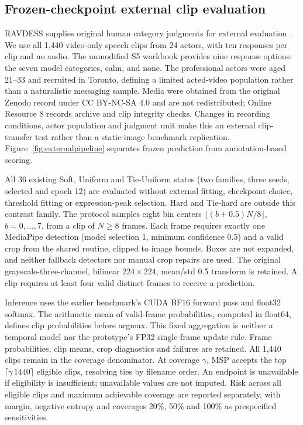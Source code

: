 \documentclass[pdflatex,sn-mathphys-num]{sn-jnl}
\begin{document}
\subsection{Frozen-checkpoint external clip evaluation}\label{sec:external}
RAVDESS supplies original human category judgments for external evaluation \cite{livingstone2018ravdess}. We use all 1,440 video-only speech clips from 24 actors, with ten responses per clip and no audio. The unmodified S5 workbook provides nine response options: the seven model categories, calm, and none. The professional actors were aged 21--33 and recruited in Toronto, defining a limited acted-video population rather than a naturalistic messaging sample. Media were obtained from the original Zenodo record under CC BY-NC-SA 4.0 and are not redistributed; Online Resource 8 records archive and clip integrity checks. Changes in recording conditions, actor population and judgment unit make this an external clip-transfer test rather than a static-image benchmark replication. Figure~\ref{fig:externalpipeline} separates frozen prediction from annotation-based scoring.

All 36 existing Soft, Uniform and Tie-Uniform states (two families, three seeds, selected and epoch 12) are evaluated without external fitting, checkpoint choice, threshold fitting or expression-peak selection. Hard and Tie-hard are outside this contrast family. The protocol samples eight bin centers $\lfloor(b+0.5)N/8\rfloor$, $b=0,\ldots,7$, from a clip of $N\geq8$ frames. Each frame requires exactly one MediaPipe detection (model selection 1, minimum confidence 0.5) and a valid crop from the shared routine, clipped to image bounds. Boxes are not expanded, and neither fallback detectors nor manual crop repairs are used. The original grayscale-three-channel, bilinear $224\times224$, mean/std 0.5 transform is retained. A clip requires at least four valid distinct frames to receive a prediction.

Inference uses the earlier benchmark's CUDA BF16 forward pass and float32 softmax. The arithmetic mean of valid-frame probabilities, computed in float64, defines clip probabilities before argmax. This fixed aggregation is neither a temporal model nor the prototype's FP32 single-frame update rule. Frame probabilities, clip means, crop diagnostics and failures are retained. All 1,440 clips remain in the coverage denominator. At coverage $\gamma$, MSP accepts the top $\lceil\gamma\,1440\rceil$ eligible clips, resolving ties by filename order. An endpoint is unavailable if eligibility is insufficient; unavailable values are not imputed. Risk across all eligible clips and maximum achievable coverage are reported separately, with margin, negative entropy and coverages 20\%, 50\% and 100\% as prespecified sensitivities.
\end{document}
